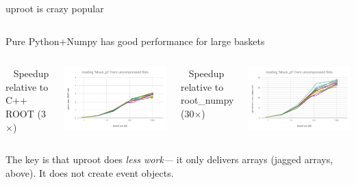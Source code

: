 \documentclass[aspectratio=169]{beamer}
\begin{document}
\begin{frame}{uproot is crazy popular}
\begin{columns}
\end{columns}
\end{frame}

\begin{frame}{Pure Python+Numpy has good performance for large baskets}
\vspace{0.5 cm}

\begin{columns}
\mbox{ } \hfill Speedup relative to C++ ROOT (3$\times$) \hfill \mbox{ }

\includegraphics[width=\linewidth]{root-none-muon.png}

\mbox{ } \hfill Speedup relative to root\_numpy (30$\times$) \hfill \mbox{ }

\includegraphics[width=\linewidth]{rootnumpy-none-muon.png}
\end{columns}

\vspace{0.5 cm}
The key is that uproot does {\it less work---} it only delivers arrays (jagged arrays, above). It does not create event objects.
\end{frame}
\end{document}
